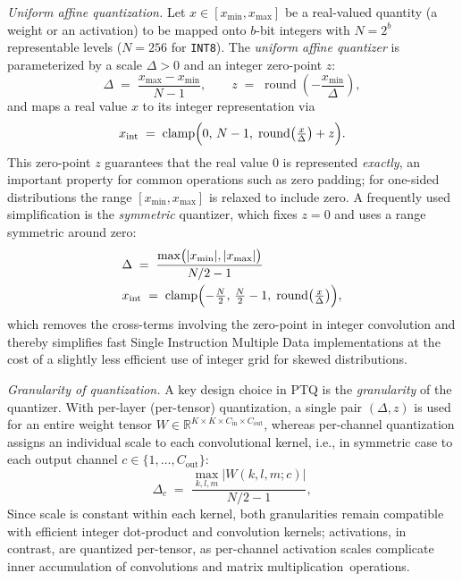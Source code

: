 \documentclass[lettersize,journal]{IEEEtran}
\begin{document}
\medskip
\noindent\textit{Uniform affine quantization.}
Let $x \in [x_{\min}, x_{\max}]$ be a real-valued quantity (a weight or
an activation) to be mapped onto $b$-bit integers with
$N = 2^{b}$ representable levels ($N = 256$ for \texttt{INT8}). The
\emph{uniform affine quantizer} is parameterized by a scale
$\Delta > 0$ and an integer zero-point $z$:
\begin{equation}
\Delta \;=\; \frac{x_{\max} - x_{\min}}{N - 1},
\qquad
z \;=\; \operatorname{round}\!\left(-\frac{x_{\min}}{\Delta}\right),
\label{eq:scale-zp}
\end{equation}
and maps a real value $x$ to its integer representation via
\begin{equation}
x_{\mathrm{int}}
\;=\;
\operatorname{clamp}\Bigl(0,\, N-1,\;
\operatorname{round}\bigl(\tfrac{x}{\Delta}\bigr) + z\Bigr).
\label{eq:quant}
\end{equation}
This zero-point $z$ guarantees that the real value $0$ is represented \emph{exactly}, an important property for common operations such as zero padding; for one-sided
distributions the range $[x_{\min}, x_{\max}]$ is relaxed to include
zero. A frequently used simplification is the \emph{symmetric} quantizer,
which fixes $z = 0$ and uses a range symmetric around zero:
\begin{align*}
&\Delta \;=\; \frac{\max\bigl(|x_{\min}|, |x_{\max}|\bigr)}{N/2 - 1}\\
&x_{\mathrm{int}} \;=\;
\operatorname{clamp}\Bigl(-\tfrac{N}{2},\, \tfrac{N}{2}-1,\;
\operatorname{round}\bigl(\tfrac{x}{\Delta}\bigr)\Bigr),
\label{eq:symmetric}
\end{align*}
which removes the cross-terms involving the zero-point in  integer
convolution and thereby simplifies fast Single Instruction Multiple Data implementations at the cost of a slightly less efficient use of  integer grid for skewed distributions.

\medskip
\noindent\textit{Granularity of quantization.}
A key design choice in  PTQ is the \emph{granularity} of the quantizer. With
{per-layer} (per-tensor) quantization, a single pair
$(\Delta, z)$ is used for an entire weight tensor
$W \in \mathbb{R}^{K \times K \times C_{\mathrm{in}} \times C_{\mathrm{out}}}$,
whereas {per-channel} quantization assigns an individual scale to
each convolutional kernel, i.e., in  symmetric case to each output channel
$c \in \{1, \dots, C_{\mathrm{out}}\}$:
\begin{equation}
\Delta_{c} \;=\;
\frac{\max\limits_{k,l,m}\bigl|W(k,l,m;c)\bigr|}{N/2 - 1},
\label{eq:per-channel}
\end{equation}
Since  scale is constant within each kernel, both granularities remain compatible with efficient integer dot-product and convolution kernels; activations, in contrast, are quantized per-tensor, as per-channel activation scales  complicate  inner accumulation of {convolutions} and {matrix multiplication}~operations.
\end{document}
